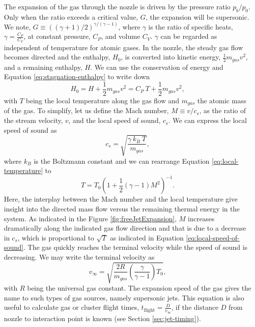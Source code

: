 The expansion of the gas through the nozzle is driven by the pressure ratio $p_{b}/p_{0}$. Only when the ratio exceeds a critical value, $G$, the expansion will be supersonic. We note, $G\equiv \left(\left(\gamma + 1\right)/2\right)^{\gamma/\left(\gamma - 1\right)}$, where $\gamma$ is the ratio of specific heats, $\gamma = \tfrac{C_{P}}{C_{V}}$, at constant pressure, $C_{P}$, and volume $C_{V}$. $\gamma$ can be regarded as independent of temperature for atomic gases. In the nozzle, the steady gas flow becomes directed and the enthalpy, $H_{0}$, is converted into kinetic energy, $\tfrac{1}{2}m_{gas} v^{2}$, and a remaining enthalpy, $H$. We can use the conservation of energy and Equation \eqref{eq:stagnation-enthalpy} to write down
\begin{equation}
H_{0}=H+\frac{1}{2}m_{gas} v^{2} = C_{P}\ T+\frac{1}{2}m_{gas}v^{2},
\label{eq:local-temperature}
\end{equation}
with $T$ being the local temperature along the gas flow and $m_{gas}$ the atomic mass of the gas. To simplify, let us define the Mach number, $M\equiv v/c_{s}$, as the ratio of the stream velocity, $v$, and the local speed of sound, $c_{s}$. We can express the local speed of sound as
\begin{equation}
c_{s}=\sqrt{\frac{\gamma\ k_{B}\ T}{m_{gas}}},
\label{eq:local-speed-of-sound}
\end{equation}
where $k_{B}$ is the Boltzmann constant and we can rearrange Equation \eqref{eq:local-temperature} to 
\begin{equation}
T=T_{0}\left(1+\frac{1}{2}\left(\gamma - 1\right)M^{2}\right)^{-1}.
\label{eq:local-temperature-definition}
\end{equation}
Here, the interplay between the Mach number and the local temperature give insight into the directed mass flow versus the remaining thermal energy in the system. As indicated in the Figure \ref{fig:freeJetExpansion}, $M$ increases dramatically along the indicated gas flow direction and that is due to a decrease in $c_{s}$, which is proportional to $\sqrt{T}$ as indicated in Equation \eqref{eq:local-speed-of-sound}. The gas quickly reaches the terminal velocity while the speed of sound is decreasing. We may write the terminal velocity as
\begin{equation}
v_{\infty}=\sqrt{\frac{2 R}{m_{gas}}\left(\frac{\gamma}{\gamma-1}\right) T_{0}},
\label{eq:terminal-velocity}
\end{equation}
with $R$ being the universal gas constant. The expansion speed of the gas gives the name to such types of gas sources, namely supersonic jets. This equation is also useful to calculate gas or cluster flight times, $t_{\text{flight}}=\frac{D}{v_{\infty}}$, if the distance $D$ from nozzle to interaction point is known (see Section \ref{sec:jet-timing}). \\[1\baselineskip]
